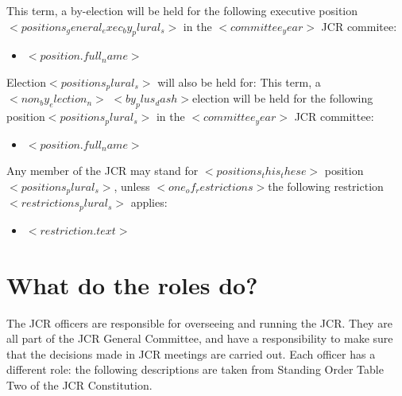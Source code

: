 \documentclass{header-footer}
\begin{document}
\renewcommand{\labelenumi}{\Roman{enumi}.}

This term, a by-election will be held for the following executive position$<{ positions_general_exec_by_plural_s }>$ in the $<{ committee_year }>$ JCR commitee:
\begin{itemize}\setlength{\itemsep}{2pt}
    \item \hyperlink{$<{ position.id }>$}{$<{ position.full_name }>$}
\end{itemize}

Election$<{ positions_plural_s }>$ will also be held for: 
This term, a$<{ non_by_election_n }>$ $<{ by_plus_dash }>$election
will be held for the following position$<{ positions_plural_s }>$
in the $<{ committee_year }>$ JCR committee:


\begin{itemize}\setlength{\itemsep}{2pt}
    \item \hyperlink{$<{ position.id }>$}{$<{ position.full_name }>$}
\end{itemize}

Any member of the JCR may stand for $<{ positions_this_these }>$
position$<{ positions_plural_s }>$,
unless $<{ one_of_restrictions }>$the following
restriction$<{ restrictions_plural_s }>$ applies:

\begin{itemize}\setlength{\itemsep}{2pt}
    \item $<{ restriction.text }>$
\end{itemize}

\section*{What do the roles do?}
The JCR officers are responsible for overseeing and running the JCR.
They are all part of the JCR General Committee,
and have a responsibility to make sure that the
decisions made in JCR meetings are carried out.
Each officer has a different role: the following descriptions are
taken from Standing Order Table Two of the JCR Constitution.

\renewcommand{\labelenumii}{\Alph{enumii}.}
\renewcommand{\labelenumiii}{\alph{enumiii}.}
\renewcommand{\labelenumiv}{\roman{enumiv}.}
\end{document}
